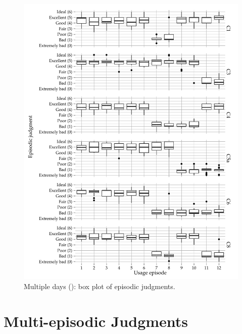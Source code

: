 \begin{figure}[H]
	\centering
\begin{knitrout}
\color{fgcolor}
\includegraphics[width=\maxwidth]{figure/plotE6-1} 

\end{knitrout}
	\caption[Multiple days (): box plot of episodic judgments]{Multiple days (): box plot of episodic judgments.}
\end{figure}

\section{Multi-episodic Judgments}

